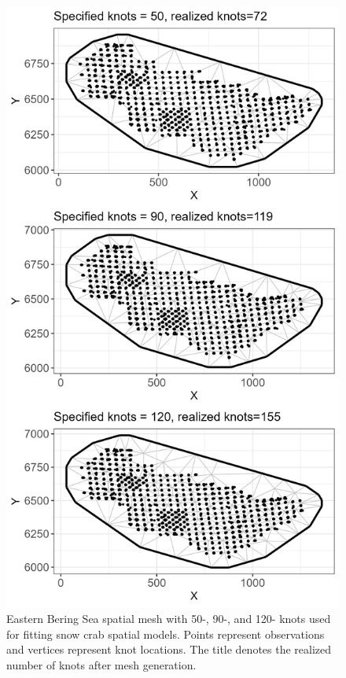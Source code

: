 \documentclass[
]{article}
\begin{document}
\pagebreak
\begin{figure}

{\centering \includegraphics[width=0.75\linewidth,height=0.75\textheight]{../SNOW/Figures/snow_EBS_mesh} 

}

\caption{Eastern Bering Sea spatial mesh with 50-, 90-, and 120- knots used for fitting snow crab spatial models. Points represent observations and vertices represent knot locations. The title denotes the realized number of knots after mesh generation.}\label{fig:snow-EBS-mesh}
\end{figure}
\end{document}
